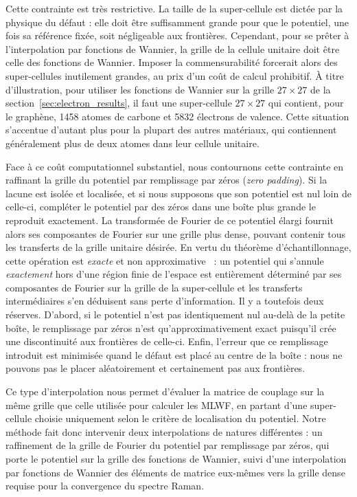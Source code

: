 Cette contrainte est très restrictive. La taille de la super-cellule est dictée par la physique du défaut : elle doit être suffisamment grande pour que le potentiel, une fois sa référence fixée, soit négligeable aux frontières. Cependant, pour se prêter à l'interpolation par fonctions de Wannier, la grille de la cellule unitaire doit être celle des fonctions de Wannier. Imposer la commensurabilité forcerait alors des super-cellules inutilement grandes, au prix d'un coût de calcul prohibitif. À titre d'illustration, pour utiliser les fonctions de Wannier sur la grille $27\times 27$ de la section~\ref{sec:electron_results}, il faut une super-cellule $27\times 27$ qui contient, pour le graphène, 1458 atomes de carbone et 5832 électrons de valence. Cette situation s'accentue d'autant plus pour la plupart des autres matériaux, qui contiennent généralement plus de deux atomes dans leur cellule unitaire.

Face à ce coût computationnel substantiel, nous contournons cette contrainte en raffinant la grille du potentiel par remplissage par zéros (\textit{zero padding}). Si la lacune est isolée et localisée, et si nous supposons que son potentiel est nul loin de celle-ci, compléter le potentiel par des zéros dans une boîte plus grande le reproduit exactement. La transformée de Fourier de ce potentiel élargi fournit alors ses composantes de Fourier sur une grille plus dense, pouvant contenir tous les transferts de la grille unitaire désirée. En vertu du théorème d'échantillonnage, cette opération est \textit{exacte} et non approximative~\cite{shannonCommunicationPresenceNoise1949} : un potentiel qui s'annule \textit{exactement} hors d'une région finie de l'espace est entièrement déterminé par ses composantes de Fourier sur la grille de la super-cellule et les transferts intermédiaires s'en déduisent sans perte d'information. Il y a toutefois deux réserves. D'abord, si le potentiel n'est pas identiquement nul au-delà de la petite boîte, le remplissage par zéros n'est qu'approximativement exact puisqu'il crée une discontinuité aux frontières de celle-ci. Enfin, l'erreur que ce remplissage introduit est minimisée quand le défaut est placé au centre de la boîte : nous ne pouvons pas le placer aléatoirement et certainement pas aux frontières.

Ce type d'interpolation nous permet d'évaluer la matrice de couplage sur la même grille que celle utilisée pour calculer les MLWF, en partant d'une super-cellule choisie uniquement selon le critère de localisation du potentiel. Notre méthode fait donc intervenir deux interpolations de natures différentes : un raffinement de la grille de Fourier du potentiel par remplissage par zéros, qui porte le potentiel sur la grille des fonctions de Wannier, suivi d'une interpolation par fonctions de Wannier des éléments de matrice eux-mêmes vers la grille dense requise pour la convergence du spectre Raman.

